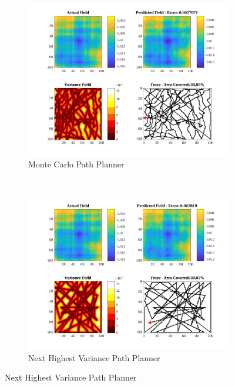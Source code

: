 \begin{figure}[htb!]
    \centering
    \begin{subfigure}[t]{0.5\textwidth}
        \centering
        \includegraphics[width=\linewidth]{figures/hbresults/mc_30p_100x100_sf_50_seed_2.png}
        \captionsetup{skip=0.10\baselineskip,size=footnotesize}
        \caption{Monte Carlo Path Planner}
    \end{subfigure}%
    ~ 
    \begin{subfigure}[t]{0.5\textwidth}
        \centering
        \includegraphics[width=\linewidth]{figures/hbresults/nhv_30p_100x100_sf_50_seed_2.png}
        \captionsetup{skip=0.10\baselineskip,size=footnotesize}
        \caption{Next Highest Variance Path Planner}

\end{subfigure}
\end{figure}
